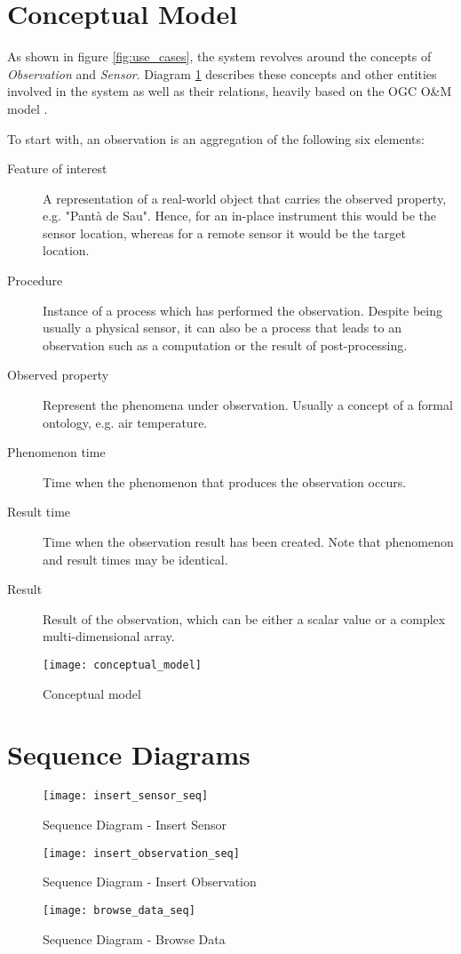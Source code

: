 \section{Conceptual Model}

As shown in figure \ref{fig:use_cases}, the system revolves around the concepts of \textit{Observation} and \textit{Sensor}. Diagram \ref{fig:conceptual_model} describes these concepts and other entities involved in the system as well as their relations, heavily based on the OGC O\&M model \cite{OM}.

To start with, an observation is an aggregation of the following six elements:

\begin{description}
\item[Feature of interest] A representation of a real-world object that carries the observed property, e.g. "Pant\`a de Sau". Hence, for an in-place instrument this would be the sensor location, whereas for a remote sensor it would be the target location.
\item[Procedure] Instance of a process which has performed the observation. Despite being usually a physical sensor, it can also be a process that leads to an observation such as a computation or the result of post-processing.
\item[Observed property] Represent the phenomena under observation. Usually a concept of a formal ontology, e.g. air temperature.
\item[Phenomenon time] Time when the phenomenon that produces the observation occurs.
\item[Result time] Time when the observation result has been created. Note that phenomenon and result times may be identical.
\item[Result] Result of the observation, which can be either a scalar value or a complex multi-dimensional array.
\end{description}

\begin{figure}[ht]
	\centering
	\texttt{[image: conceptual\_model]}
	\caption{Conceptual model}
	\label{fig:conceptual_model}
\end{figure}
\newpage

\section{Sequence Diagrams}

\begin{figure}[ht]
	\centering
	\texttt{[image: insert\_sensor\_seq]}
	\caption{Sequence Diagram - Insert Sensor}
	\label{fig:insert_sensor_seq}
\end{figure}

\begin{figure}[ht]
	\centering
	\texttt{[image: insert\_observation\_seq]}
	\caption{Sequence Diagram - Insert Observation}
	\label{fig:insert_observation_seq}
\end{figure}

\begin{figure}[ht]
	\centering
	\texttt{[image: browse\_data\_seq]}
	\caption{Sequence Diagram - Browse Data}
	\label{fig:browse_data_seq}
\end{figure}
